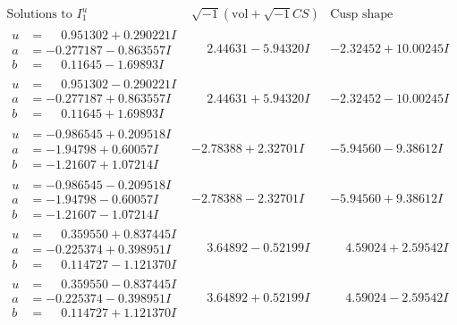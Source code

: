\documentclass[1p]{elsarticle_modified}
\theoremstyle{definition}
\newcommand{\I}{\sqrt{-1}}
\begin{document}
$$\begin{array}{c|c|c}  
\text{Solutions to }I^u_{1}& \I (\text{vol} + \sqrt{-1}CS) & \text{Cusp shape}\\
 \hline 
\begin{aligned}
u &= \phantom{-}0.951302 + 0.290221 I \\
a &= -0.277187 - 0.863557 I \\
b &= \phantom{-}0.11645 - 1.69893 I\end{aligned}
 & \phantom{-}2.44631 - 5.94320 I & -2.32452 + 10.00245 I \\ \hline\begin{aligned}
u &= \phantom{-}0.951302 - 0.290221 I \\
a &= -0.277187 + 0.863557 I \\
b &= \phantom{-}0.11645 + 1.69893 I\end{aligned}
 & \phantom{-}2.44631 + 5.94320 I & -2.32452 - 10.00245 I \\ \hline\begin{aligned}
u &= -0.986545 + 0.209518 I \\
a &= -1.94798 + 0.60057 I \\
b &= -1.21607 + 1.07214 I\end{aligned}
 & -2.78388 + 2.32701 I & -5.94560 - 9.38612 I \\ \hline\begin{aligned}
u &= -0.986545 - 0.209518 I \\
a &= -1.94798 - 0.60057 I \\
b &= -1.21607 - 1.07214 I\end{aligned}
 & -2.78388 - 2.32701 I & -5.94560 + 9.38612 I \\ \hline\begin{aligned}
u &= \phantom{-}0.359550 + 0.837445 I \\
a &= -0.225374 + 0.398951 I \\
b &= \phantom{-}0.114727 - 1.121370 I\end{aligned}
 & \phantom{-}3.64892 - 0.52199 I & \phantom{-}4.59024 + 2.59542 I \\ \hline\begin{aligned}
u &= \phantom{-}0.359550 - 0.837445 I \\
a &= -0.225374 - 0.398951 I \\
b &= \phantom{-}0.114727 + 1.121370 I\end{aligned}
 & \phantom{-}3.64892 + 0.52199 I & \phantom{-}4.59024 - 2.59542 I \\ \hline\begin{aligned}

\end{aligned}
\end{array}$$
\end{document}
